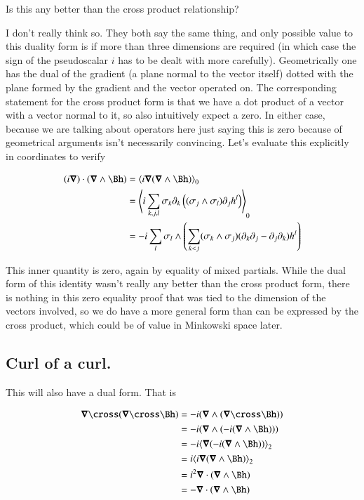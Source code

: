 Is this any better than the cross product relationship?

I don't really think so.  They both say the same thing, and only possible value to this duality form is if more than three dimensions are required (in which case the sign of the pseudoscalar $i$ has to be dealt with more carefully).  Geometrically one has the dual of the gradient (a plane normal to the vector itself) dotted with the plane formed by the gradient and the vector operated on.  The corresponding statement for the cross product form is that we have a dot product of a vector with a vector normal to it, so also intuitively expect a zero.  In either case, because we are talking about operators here
just saying this is zero because of geometrical arguments isn't necessarily convincing.  Let's evaluate this explicitly in 
coordinates to verify

\begin{align*}
(i \spacegrad) \cdot (\spacegrad \wedge \Bh) 
&= \gpgradezero{i \spacegrad (\spacegrad \wedge \Bh) } \\
&= \gpgradezero{i \sum_{k,j,l} \sigma_k \partial_k \left((\sigma_j \wedge \sigma_l) \partial_j h^l\right) } \\
&= -i \sum_{l} \sigma_l \wedge \left( \sum_{k<j} (\sigma_k \wedge \sigma_j) (\partial_k \partial_j -\partial_j \partial_k) h^l \right) \\
\end{align*}

This inner quantity is zero, again by equality of mixed partials.  While the dual form of this identity wasn't really any better than the cross
product form, there is nothing in this zero equality proof that was tied to the dimension of the vectors involved, so we do have a more general form
than can be expressed by the cross product, which could be of value in Minkowski space later.

\subsection{Curl of a curl. }

This will also have a dual form.  That is

\begin{align*}
\spacegrad \cross (\spacegrad \cross \Bh)
&= -i (\spacegrad \wedge (\spacegrad \cross \Bh)) \\
&= -i (\spacegrad \wedge (-i (\spacegrad \wedge \Bh))) \\
&= -i \gpgradetwo{\spacegrad (-i (\spacegrad \wedge \Bh))} \\
&= i \gpgradetwo{i \spacegrad (\spacegrad \wedge \Bh)} \\
&= i^2 \spacegrad \cdot (\spacegrad \wedge \Bh) \\
&= - \spacegrad \cdot (\spacegrad \wedge \Bh) \\
\end{align*}

